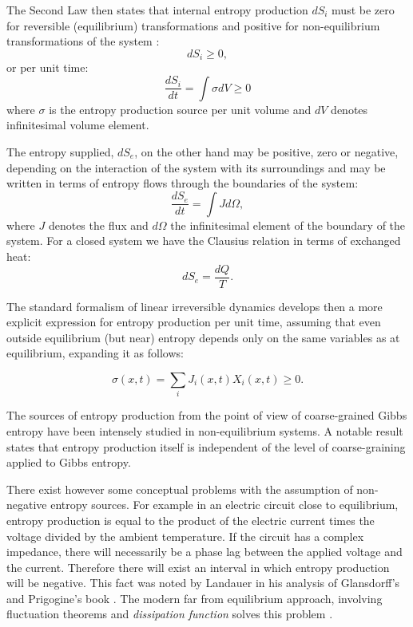 \documentclass[a4paper,12pt]{article}
\begin{document}
The Second Law then states that internal entropy production $dS_i$ must be zero for reversible (equilibrium) transformations and positive for non-equilibrium transformations of the system \cite{DeGroot:2013ue}:
\begin{equation}
  dS_i \geq 0,
\end{equation}
or per unit time:
\begin{equation}
  	\frac{dS_i}{dt}=\int \sigma dV \geq 0
\end{equation}
where $\sigma$ is the entropy production source per unit volume and $dV$ denotes infinitesimal volume element.

The entropy supplied, $dS_e$, on the other hand may be positive, zero or negative, depending on the interaction of the system with its surroundings and may be written in terms of entropy flows through the boundaries of the system:
\begin{equation}
  	\frac{dS_e}{dt}=\int J d\Omega,
\end{equation}
where $J$ denotes the flux and $d\Omega$ the infinitesimal element of the boundary of the system. For a closed system we have the Clausius relation in terms of exchanged heat:
\begin{equation}
  dS_e=\frac{dQ}{T}.
\end{equation}


The standard formalism of linear irreversible dynamics develops then a more explicit expression for entropy production per unit time, assuming that even outside equilibrium (but near) entropy depends only on the same variables as at equilibrium, expanding it as follows: 

\begin{equation}
  \sigma(x,t) = \sum_i J_i(x,t) X_i(x,t) \geq 0.
\end{equation}


The sources of entropy production from the point of view of coarse-grained Gibbs entropy have been intensely studied in non-equilibrium systems. A notable result \cite{Gilbert:1999ff, Goldstein:1998ip} states that entropy production itself is independent of the level of coarse-graining applied to Gibbs entropy.

There exist however some conceptual problems with the assumption of non-negative entropy sources.
For example in an electric circuit close to equilibrium, entropy production is equal to the product of the electric current times the voltage divided by the ambient temperature. If the circuit has a complex impedance, there will necessarily be a phase lag between the applied voltage and the current. Therefore there will exist an interval in which entropy production will be negative.
This fact was noted by Landauer in his analysis \cite{Landauer:pJ4RYJRG} of Glansdorff's and Prigogine's book \cite{Anonymous:NJxQY1gt}. The modern far from equilibrium approach, involving fluctuation theorems and \textit{dissipation function} solves this problem \cite{Evans:2241458}.
\end{document}
